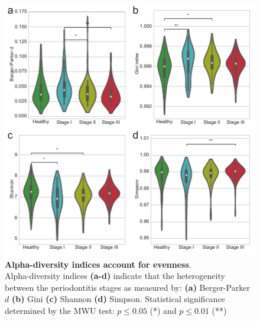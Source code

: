 \documentclass[11pt, a4paper, onecolumn, oneside]{report}
\begin{document}
            \begin{figure}[p]
                \centering
                \includegraphics[width=\linewidth]{Figures/Periodontitis/Figure_R06.pdf}
                \caption[Alpha-diversity indices account for evenness]{\textbf{Alpha-diversity indices account for evenness}. \\
                    Alpha-diversity indices \textbf{(a-d)} indicate that the heterogeneity between the periodontitis stages as measured by: \textbf{(a)} Berger-Parker $d$ \textbf{(b)} Gini \textbf{(c)} Shannon \textbf{(d)} Simpson. Statistical significance determined by the MWU test: $p \le 0.05$ (*) and $p \le 0.01$ (**)}
                \label{fig:Periodontitis-alpha}
            \end{figure}
            \clearpage
\end{document}
